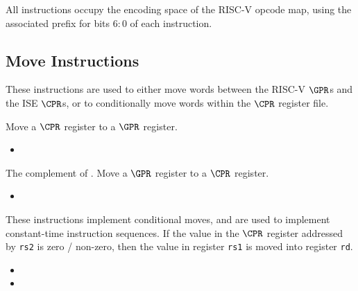 
All instructions occupy the \encspace encoding space of the RISC-V opcode
map, using the associated \encopcode prefix for bits $6:0$ of each 
instruction.

\subsection{Move Instructions}

These instructions are used to either move words between the RISC-V $\GPR$s
and the ISE $\CPR$s, or to conditionally move words within the $\CPR$
register file.


\ienc{\iencmvtwogpr}

Move a $\CPR$ register to a $\GPR$ register.

\begin{itemize}
\item {}
\end{itemize}


\ienc{\iencmvtwocop}

The complement of .
Move a $\GPR$ register to a $\CPR$ register.

\begin{itemize}
\item {}
\end{itemize}


\ienc{\ienccmovcr\ienccmovncr}

These instructions implement conditional moves, and are used to implement
constant-time instruction sequences.
If the value in the $\CPR$ register addressed by {\tt rs2} is
zero / non-zero, then the value in register {\tt rs1} is moved
into register {\tt rd}.

\begin{itemize}
\item {}
\item {}
\end{itemize}

